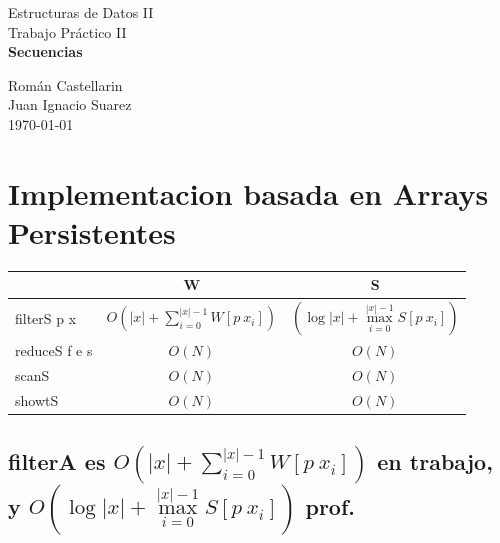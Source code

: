 \documentclass[12pt]{article}
\begin{document}
\begin{titlepage}
\vspace{0.5cm}

\begin{center}
\normalsize{\sc Estructuras de Datos II}\\
\vspace{0.5cm}
\large{Trabajo Práctico II}\\

\Large{\bf Secuencias}\\
\vspace{5cm}

\normalsize
Román Castellarin\\
Juan Ignacio Suarez\\

\vspace*{0.5cm}
\small{ \today }


\end{center}
\end{titlepage}
\newpage

\section{Implementacion basada en Arrays Persistentes}

\begin{tabular}{@{}lcc@{}}
\toprule
        & W & S \\ \midrule
filterS p x & $O(|x| + \sum\limits_{i=0}^{|x|-1} W[p\ x_i])$  &  $(\log |x| + \max\limits_{i=0}^{|x|-1} S[p\ x_i])$  \\
reduceS f e s & $O(N)$  &  $O(N)$ \\
scanS   & $O(N)$  &  $O(N)$ \\
showtS  & $O(N)$  &  $O(N)$ \\ \bottomrule
\end{tabular}

\subsection{filterA es $O(|x| + \sum\limits_{i=0}^{|x|-1} W[p\ x_i])$ en trabajo, y $O(\log |x| + \max\limits_{i=0}^{|x|-1} S[p\ x_i])$ prof.}
\end{document}
